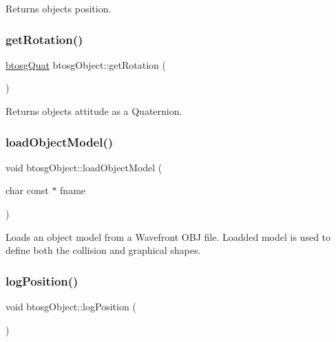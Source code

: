 Returns object\textquotesingle{}s position. \mbox{\label{classbtosgObject_a3b825999ad3a51bde743d4085ff19dae}} 
\subsubsection{\texorpdfstring{getRotation()}{getRotation()}}
{\footnotesize\ttfamily \mbox{\hyperlink{classbtosgQuat}{btosg\+Quat}} btosg\+Object\+::get\+Rotation (\begin{DoxyParamCaption}{ }\end{DoxyParamCaption})\hspace{0.3cm}{\ttfamily [inline]}}

Returns object\textquotesingle{}s attitude as a Quaternion. \mbox{\label{classbtosgObject_a91838b8235579da178fcc06e6d3d47f3}} 
\subsubsection{\texorpdfstring{loadObjectModel()}{loadObjectModel()}}
{\footnotesize\ttfamily void btosg\+Object\+::load\+Object\+Model (\begin{DoxyParamCaption}\item[{char const $\ast$}]{fname }\end{DoxyParamCaption})}

Loads an object model from a Wavefront O\+BJ file. Loadded model is used to define both the collision and graphical shapes. \mbox{\label{classbtosgObject_acfd70fa6477c80fd7f29ad7ab9f4f067}} 
\subsubsection{\texorpdfstring{logPosition()}{logPosition()}}
{\footnotesize\ttfamily void btosg\+Object\+::log\+Position (\begin{DoxyParamCaption}{ }\end{DoxyParamCaption})\hspace{0.3cm}{\ttfamily [inline]}}

